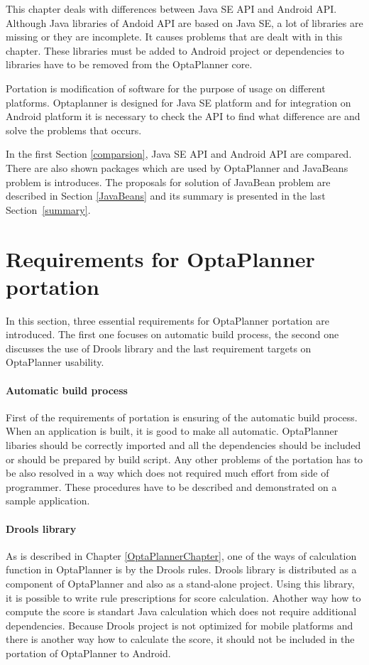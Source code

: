 This chapter deals with differences between Java SE API and Android API. Although Java libraries of Andoid API are based on Java SE, a lot of libraries are missing or they are incomplete. It causes problems that are dealt with in this chapter. These libraries must be added to Android project or dependencies to libraries have to be removed from the OptaPlanner core.

Portation is modification of software for the purpose of usage on different platforms. Optaplanner is designed for Java SE platform and for integration on Android platform it is necessary to check the API to find what difference are and solve the problems that occurs.

In the first Section \ref{comparsion}, Java SE API and Android API are compared. There are also shown packages which are used by OptaPlanner and JavaBeans problem is introduces. The proposals for solution of JavaBean problem are described in Section \ref{JavaBeans} and its summary is presented in the last Section~\ref{summary}.

\section{Requirements for OptaPlanner portation}
In this section, three essential requirements for OptaPlanner portation are introduced. The first one focuses on
automatic build process, the second one discusses the use of Drools library and the last requirement targets on
OptaPlanner usability.

\paragraph{Automatic build process}
First of the requirements of portation is ensuring of the automatic build process. When an application is built, it is
good to make all automatic. OptaPlanner libaries should be correctly imported and all the dependencies should be
included or should be prepared by build script. Any other problems of the portation has to be also resolved in a way
which does not required much effort from side of programmer. These procedures have to be described and demonstrated
on a sample application.

\paragraph{Drools library}
As is described in Chapter \ref{OptaPlannerChapter}, one of the ways of calculation function in OptaPlanner is by the
Drools rules. Drools library is distributed as a component of OptaPlanner and also as a stand-alone project. Using this
library, it is possible to write rule prescriptions for score calculation. Ahother way how to compute the score is
standart Java calculation which does not require additional dependencies. Because Drools project is not optimized for
mobile platforms and there is another way how to calculate the score, it should not be included in the portation of
OptaPlanner to Android.

